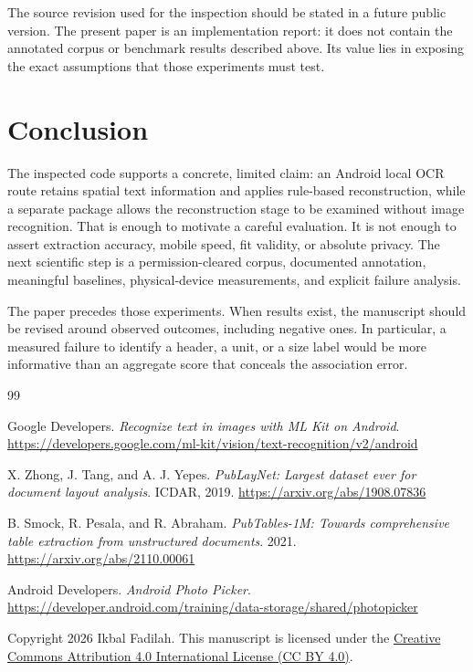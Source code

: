 \documentclass[10pt,letterpaper]{article}
\begin{document}
The source revision used for the inspection should be stated in a future public version. The present paper is an implementation report: it does not contain the annotated corpus or benchmark results described above. Its value lies in exposing the exact assumptions that those experiments must test.

\section{Conclusion}

The inspected code supports a concrete, limited claim: an Android local OCR route retains spatial text information and applies rule-based reconstruction, while a separate package allows the reconstruction stage to be examined without image recognition. That is enough to motivate a careful evaluation. It is not enough to assert extraction accuracy, mobile speed, fit validity, or absolute privacy. The next scientific step is a permission-cleared corpus, documented annotation, meaningful baselines, physical-device measurements, and explicit failure analysis.

The paper precedes those experiments. When results exist, the manuscript should be revised around observed outcomes, including negative ones. In particular, a measured failure to identify a header, a unit, or a size label would be more informative than an aggregate score that conceals the association error.

\begin{thebibliography}{99}

 Google Developers. \emph{Recognize text in images with ML Kit on Android}. \url{https://developers.google.com/ml-kit/vision/text-recognition/v2/android}

 X. Zhong, J. Tang, and A. J. Yepes. \emph{PubLayNet: Largest dataset ever for document layout analysis}. ICDAR, 2019. \url{https://arxiv.org/abs/1908.07836}

 B. Smock, R. Pesala, and R. Abraham. \emph{PubTables-1M: Towards comprehensive table extraction from unstructured documents}. 2021. \url{https://arxiv.org/abs/2110.00061}

 Android Developers. \emph{Android Photo Picker}. \url{https://developer.android.com/training/data-storage/shared/photopicker}

\end{thebibliography}

\noindent\footnotesize Copyright 2026 Ikbal Fadilah. This manuscript is licensed under the \href{https://creativecommons.org/licenses/by/4.0/}{Creative Commons Attribution 4.0 International License (CC BY 4.0)}.
\end{document}
